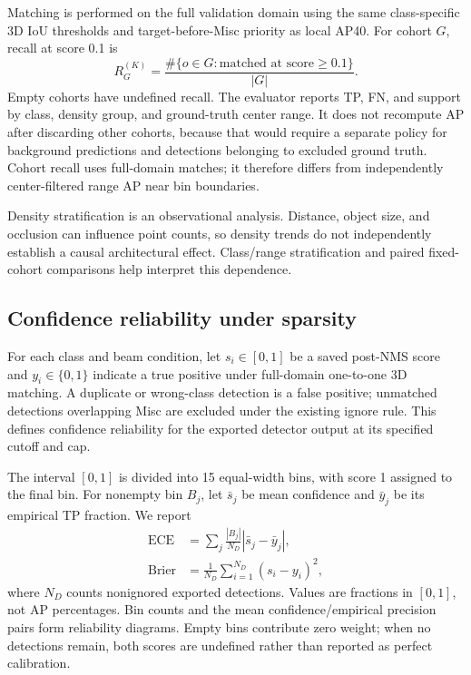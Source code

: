 \documentclass[10pt,twocolumn]{article}
\begin{document}
Matching is performed on the full validation domain using the same class-specific 3D IoU thresholds and target-before-Misc priority as local AP40. For cohort $G$, recall at score 0.1 is
\begin{equation}
R_G^{(K)}=\frac{\#\{o\in G:\text{matched at score}\geq0.1\}}{|G|}.
\end{equation}
Empty cohorts have undefined recall. The evaluator reports TP, FN, and support by class, density group, and ground-truth center range. It does not recompute AP after discarding other cohorts, because that would require a separate policy for background predictions and detections belonging to excluded ground truth. Cohort recall uses full-domain matches; it therefore differs from independently center-filtered range AP near bin boundaries.

Density stratification is an observational analysis. Distance, object size, and occlusion can influence point counts, so density trends do not independently establish a causal architectural effect. Class/range stratification and paired fixed-cohort comparisons help interpret this dependence.

\subsection{Confidence reliability under sparsity}
\label{sec:calibration}
For each class and beam condition, let $s_i\in[0,1]$ be a saved post-NMS score and $y_i\in\{0,1\}$ indicate a true positive under full-domain one-to-one 3D matching. A duplicate or wrong-class detection is a false positive; unmatched detections overlapping Misc are excluded under the existing ignore rule. This defines confidence reliability for the exported detector output at its specified cutoff and cap.

The interval $[0,1]$ is divided into 15 equal-width bins, with score 1 assigned to the final bin. For nonempty bin $B_j$, let $\bar{s}_j$ be mean confidence and $\bar{y}_j$ be its empirical TP fraction. We report
\begin{align}
\operatorname{ECE}&=\sum_j\frac{|B_j|}{N_D}|\bar{s}_j-\bar{y}_j|,\\
\operatorname{Brier}&=\frac{1}{N_D}\sum_{i=1}^{N_D}(s_i-y_i)^2,
\end{align}
where $N_D$ counts nonignored exported detections. Values are fractions in $[0,1]$, not AP percentages. Bin counts and the mean confidence/empirical precision pairs form reliability diagrams. Empty bins contribute zero weight; when no detections remain, both scores are undefined rather than reported as perfect calibration.
\end{document}
